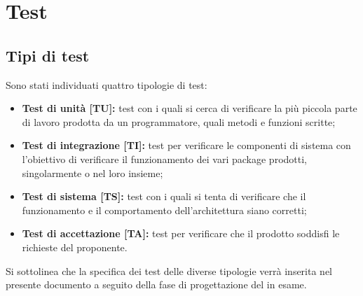 \newpage
\section{Test}
	\subsection{Tipi di test}
	Sono stati individuati quattro tipologie di test:
	\begin{itemize}
		\item \textbf{Test di unità [TU]:} test con i quali si cerca di verificare la più piccola parte di lavoro prodotta da un programmatore, quali metodi e funzioni scritte;
		\item \textbf{Test di integrazione [TI]:} test per verificare le componenti di sistema con l'obiettivo di verificare il funzionamento dei vari package prodotti, singolarmente o nel loro insieme;
		\item \textbf{Test di sistema [TS]:} test con i quali si tenta di verificare che il funzionamento e il comportamento dell'architettura siano corretti;
		\item \textbf{Test di accettazione [TA]:} test per verificare che il prodotto soddisfi le richieste del proponente.
	\end{itemize}
	Si sottolinea che la specifica dei test delle diverse tipologie verrà inserita nel presente documento a seguito della fase di progettazione del  in esame.

